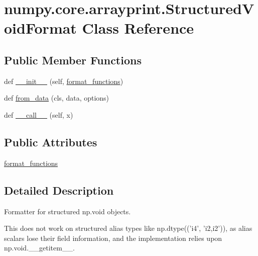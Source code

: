 \hypertarget{classnumpy_1_1core_1_1arrayprint_1_1StructuredVoidFormat}{}\section{numpy.\+core.\+arrayprint.\+Structured\+Void\+Format Class Reference}
\label{classnumpy_1_1core_1_1arrayprint_1_1StructuredVoidFormat}
\subsection*{Public Member Functions}
\begin{DoxyCompactItemize}
\item 
def \hyperlink{classnumpy_1_1core_1_1arrayprint_1_1StructuredVoidFormat_a3fba7a3733af8e1f1263789e1f30bcf1}{\+\_\+\+\_\+init\+\_\+\+\_\+} (self, \hyperlink{classnumpy_1_1core_1_1arrayprint_1_1StructuredVoidFormat_ae081c531a2c64300a85f166857f59385}{format\+\_\+functions})
\item 
def \hyperlink{classnumpy_1_1core_1_1arrayprint_1_1StructuredVoidFormat_a501a75770e1affb2ad42095a8a79f686}{from\+\_\+data} (cls, data, options)
\item 
def \hyperlink{classnumpy_1_1core_1_1arrayprint_1_1StructuredVoidFormat_a93b4c38546b25797b58ad65d651ead71}{\+\_\+\+\_\+call\+\_\+\+\_\+} (self, x)
\end{DoxyCompactItemize}
\subsection*{Public Attributes}
\begin{DoxyCompactItemize}
\item 
\hyperlink{classnumpy_1_1core_1_1arrayprint_1_1StructuredVoidFormat_ae081c531a2c64300a85f166857f59385}{format\+\_\+functions}
\end{DoxyCompactItemize}


\subsection{Detailed Description}
\begin{DoxyVerb}Formatter for structured np.void objects.

This does not work on structured alias types like np.dtype(('i4', 'i2,i2')),
as alias scalars lose their field information, and the implementation
relies upon np.void.__getitem__.
\end{DoxyVerb}
 

